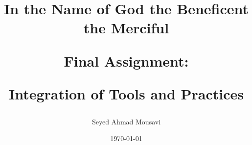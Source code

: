 \documentclass{article}
\begin{document}
\pagestyle{fancy}
\begin{titlepage}
\title{
\textbf{In the Name of God the Beneficent the Merciful}\par
    \vspace{2in}

\textbf{Final Assignment:}\par

\textbf{Integration of Tools and Practices}\par
    \vspace{2in}
}

\author{Seyed Ahmad Mousavi}

\date{\today}
\maketitle
\thispagestyle{empty}
\end{titlepage}
\end{document}
